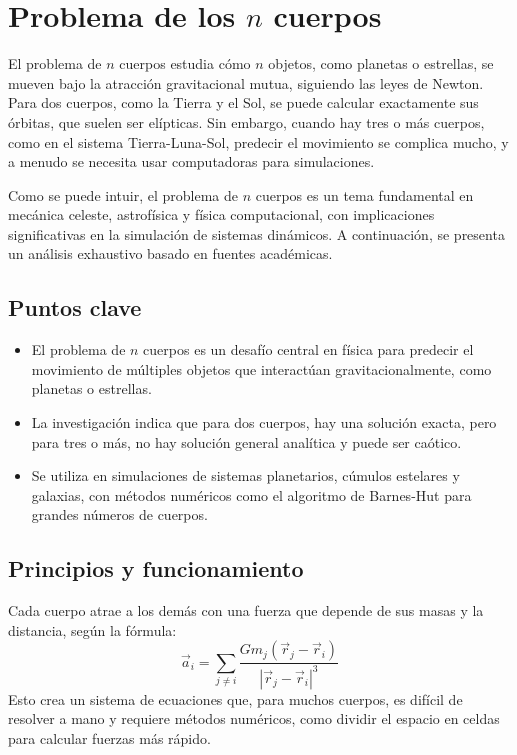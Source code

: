 \section{Problema de los \texorpdfstring{$n$}{n} cuerpos}%
\label{sec:n-body_problem}

El problema de $n$ cuerpos estudia cómo $n$ objetos, como planetas o estrellas, se mueven bajo la atracción gravitacional mutua, siguiendo las leyes de Newton. Para dos cuerpos, como la Tierra y el Sol, se puede calcular exactamente sus órbitas, que suelen ser elípticas. Sin embargo, cuando hay tres o más cuerpos, como en el sistema Tierra-Luna-Sol, predecir el movimiento se complica mucho, y a menudo se necesita usar computadoras para simulaciones.

Como se puede intuir, el problema de $n$ cuerpos es un tema fundamental en mecánica celeste, astrofísica y física computacional, con implicaciones significativas en la simulación de sistemas dinámicos. A continuación, se presenta un análisis exhaustivo basado en fuentes académicas.

\subsection{Puntos clave}
\begin{itemize}
    \item El problema de $n$ cuerpos es un desafío central en física para predecir el movimiento de múltiples objetos que interactúan gravitacionalmente, como planetas o estrellas.
    \item La investigación indica que para dos cuerpos, hay una solución exacta, pero para tres o más, no hay solución general analítica y puede ser caótico.
    \item Se utiliza en simulaciones de sistemas planetarios, cúmulos estelares y galaxias, con métodos numéricos como el algoritmo de Barnes-Hut para grandes números de cuerpos.
\end{itemize}

\subsection{Principios y funcionamiento}
Cada cuerpo atrae a los demás con una fuerza que depende de sus masas y la distancia, según la fórmula:
\begin{equation}
    \vec{a}_i = \sum_{j \neq i} \frac{G m_j (\vec{r}_j - \vec{r}_i)}{|\vec{r}_j - \vec{r}_i|^3}
\end{equation}
Esto crea un sistema de ecuaciones que, para muchos cuerpos, es difícil de resolver a mano y requiere métodos numéricos, como dividir el espacio en celdas para calcular fuerzas más rápido.


